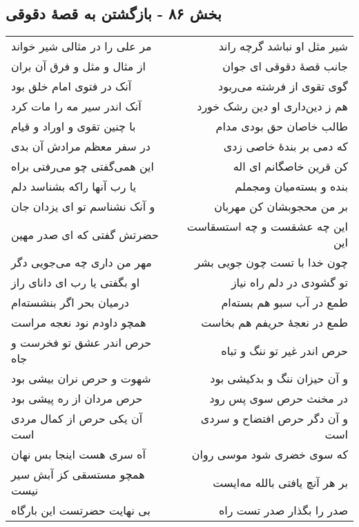 \begin{center}
\section*{بخش ۸۶ - بازگشتن به قصهٔ دقوقی}
\label{sec:sh086}
\begin{longtable}{l p{0.5cm} r}
مر علی را در مثالی شیر خواند
&&
شیر مثل او نباشد گرچه راند
\\
از مثال و مثل و فرق آن بران
&&
جانب قصهٔ دقوقی ای جوان
\\
آنک در فتوی امام خلق بود
&&
گوی تقوی از فرشته می‌ربود
\\
آنک اندر سیر مه را مات کرد
&&
هم ز دین‌داری او دین رشک خورد
\\
با چنین تقوی و اوراد و قیام
&&
طالب خاصان حق بودی مدام
\\
در سفر معظم مرادش آن بدی
&&
که دمی بر بندهٔ خاصی زدی
\\
این همی‌گفتی چو می‌رفتی براه
&&
کن قرین خاصگانم ای اله
\\
یا رب آنها راکه بشناسد دلم
&&
بنده و بسته‌میان ومجملم
\\
و آنک نشناسم تو ای یزدان جان
&&
بر من محجوبشان کن مهربان
\\
حضرتش گفتی که ای صدر مهین
&&
این چه عشقست و چه استسقاست این
\\
مهر من داری چه می‌جویی دگر
&&
چون خدا با تست چون جویی بشر
\\
او بگفتی یا رب ای دانای راز
&&
تو گشودی در دلم راه نیاز
\\
درمیان بحر اگر بنشسته‌ام
&&
طمع در آب سبو هم بسته‌ام
\\
همچو داودم نود نعجه مراست
&&
طمع در نعجهٔ حریفم هم بخاست
\\
حرص اندر عشق تو فخرست و جاه
&&
حرص اندر غیر تو ننگ و تباه
\\
شهوت و حرص نران بیشی بود
&&
و آن حیزان ننگ و بدکیشی بود
\\
حرص مردان از ره پیشی بود
&&
در مخنث حرص سوی پس رود
\\
آن یکی حرص از کمال مردی است
&&
و آن دگر حرص افتضاح و سردی است
\\
آه سری هست اینجا بس نهان
&&
که سوی خضری شود موسی روان
\\
همچو مستسقی کز آبش سیر نیست
&&
بر هر آنچ یافتی بالله مه‌ایست
\\
بی نهایت حضرتست این بارگاه
&&
صدر را بگذار صدر تست راه
\\
\end{longtable}
\end{center}
